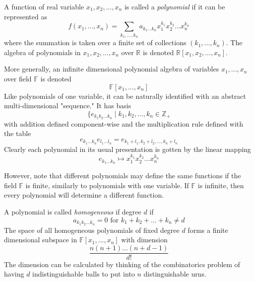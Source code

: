 \documentclass{article}
\begin{document}
      \begin{definition}
        A function of real variable $x_1, x_2, ..., x_n$ is called a \textit{polynomial} if it can be represented as 
        \begin{equation}
          f(x_1, ..., x_n) =  \sum_{k_1, ..., k_n} a_{k_1 ... k_n} x_1^{k_1} x_2^{k_2} ... x_n^{k_n}
        \end{equation}
        where the summation is taken over a finite set of collections $(k_1, ..., k_n)$. The algebra of polynomials in $x_1, x_2, ..., x_n$ over $\mathbb{R}$ is denoted $\mathbb{R}[x_1, x_2, ..., x_n]$. 
      \end{definition}

      \begin{definition}
        More generally, an infinite dimensional polynomial algebra of variables $x_1, ..., x_n$ over field $\mathbb{F}$ is denoted
        \begin{equation}
          \mathbb{F}[x_1, ..., x_n]
        \end{equation}
        Like polynomials of one variable, it can be naturally identified with an abstract multi-dimensional "sequence." It has basis 
        \begin{equation}
          \{e_{k_1 k_2 ... k_n} \;|\; k_1, k_2, ..., k_n \in \mathbb{Z}_+
        \end{equation}
        with addition defined component-wise and the multiplication rule defined with the table
        \begin{equation}
          e_{k_1...k_n} e_{l_1 ... l_n} = e_{k_1 + l_1, k_2 + l_2, ..., k_n + l_n}
        \end{equation}
        Clearly each polynomial in its usual presentation is gotten by the linear mapping
        \begin{equation}
          e_{k_1 ... k_n} \mapsto x_1^{k_1} x_2^{k_2} ... x_n^{k_n}
        \end{equation}
      \end{definition}

      However, note that different polynomials may define the same functions if the field $\mathbb{F}$ is finite, similarly to polynomials with one variable. If $\mathbb{F}$ is infinite, then every polynomial will determine a different function. 

      \begin{definition}
        A polynomial is called \textit{homogeneous} if degree $d$ if 
        \begin{equation}
          a_{k_1 k_2 ... k_n} = 0 \text{ for } k_1 + k_2 + ... + k_n \neq d
        \end{equation}
        The space of all homogeneous polynomials of fixed degree $d$ forms a finite dimensional subspace in $\mathbb{F}[x_1, ..., x_n]$ with dimension 
        \begin{equation}
          \frac{n(n+1)...(n+d-1)}{d!}
        \end{equation}
        The dimension can be calculated by thinking of the combinatorics problem of having $d$ indistinguishable balls to put into $n$ distinguishable urns. 
      \end{definition}
\end{document}
